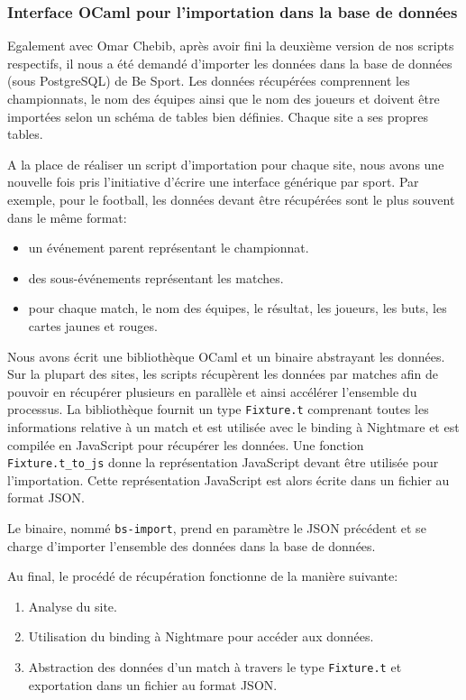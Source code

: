 \subsubsection*{Interface OCaml pour l'importation dans la base de données}

Egalement avec Omar Chebib, après avoir fini la deuxième version de nos
scripts respectifs, il nous a été demandé d'importer les données dans la base de
données (sous PostgreSQL) de
Be Sport. Les données récupérées comprennent les championnats, le nom des
équipes ainsi que le nom des joueurs et doivent être importées selon un schéma
de tables bien définies. Chaque site a ses propres tables.

A la place de réaliser un script d'importation pour chaque site, nous avons une
nouvelle fois pris l'initiative d'écrire une interface générique par sport.
Par exemple, pour le football, les données devant être récupérées sont le plus
souvent dans le même format:
\begin{itemize}
  \item un événement parent représentant le championnat.
  \item des sous-événements représentant les matches.
  \item pour chaque match, le nom des équipes, le résultat, les joueurs, les
    buts, les cartes jaunes et rouges.
\end{itemize}

Nous avons écrit une bibliothèque OCaml et un binaire abstrayant les
données.
Sur la plupart des sites, les scripts récupèrent les données par matches afin de
pouvoir en récupérer plusieurs en parallèle et ainsi accélérer l'ensemble
du processus. La
bibliothèque fournit un type \verb|Fixture.t| comprenant toutes les informations
relative à un match et est utilisée avec le binding à
Nightmare et est compilée en JavaScript pour récupérer les données. Une fonction
\verb|Fixture.t_to_js| donne la représentation JavaScript devant être
utilisée pour l'importation. Cette représentation JavaScript est alors écrite
dans un fichier au format JSON.

Le binaire, nommé \verb|bs-import|, prend en paramètre le JSON précédent et se charge d'importer l'ensemble des données dans la base de données.

Au final, le procédé de récupération fonctionne de la manière suivante:

\begin{enumerate}
\item Analyse du site.
\item Utilisation du binding à Nightmare pour accéder aux données.
  \item Abstraction des données d'un match à travers le type \verb|Fixture.t| et
    exportation dans un fichier au format JSON.
\end{enumerate}

